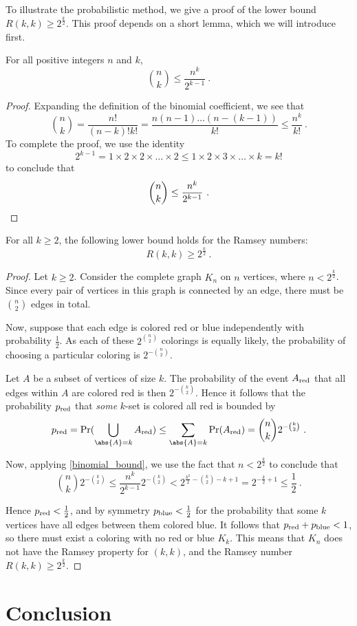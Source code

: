 \documentclass{article}
\begin{document}
To illustrate the probabilistic method, we give a proof of the lower bound $R(k,k) \geq 2^{\frac k 2}$. This proof depends on a short lemma, which we will introduce first.

\begin{Lemma} \label{binomial_bound}
    For all positive integers $n$ and $k$,
    \[ {n \choose k} \leq \frac{n^k}{2^{k-1}} \ . \]
\end{Lemma}

\begin{proof}
    Expanding the definition of the binomial coefficient, we see that
    \[
        {n \choose k}
        = \frac{n!}{(n-k)!k!}
        = \frac{n(n-1)\ldots(n-(k-1))}{k!}
        \leq \frac{n^k}{k!} \ .
    \]
    To complete the proof, we use the identity
    \[
        2^{k-1}
        = 1 \times 2 \times 2 \times \ldots \times 2
        \leq 1 \times 2 \times 3 \times \ldots \times k
        = k!
    \]
    to conclude that
    \[
        {n \choose k} \leq \frac{n^k}{2^{k-1}} \ . \qedhere
    \]
\end{proof}

\begin{Theorem}
    For all $k \geq 2$, the following lower bound holds for the Ramsey numbers:
    \[ R(k,k) \geq 2^{\frac k 2} \ . \]
\end{Theorem}

\begin{proof}
    Let $k \geq 2$. Consider the complete graph $K_n$ on $n$ vertices, where $n < 2^{\frac k 2}$. Since every pair of vertices in this graph is connected by an edge, there must be $n \choose 2$ edges in total.

    Now, suppose that each edge is colored red or blue independently with probability $\frac 1 2$. As each of these $2^{n \choose 2}$ colorings is equally likely, the probability of choosing a particular coloring is $2^{-{n \choose 2}}$.

    Let $A$ be a subset of vertices of size $k$. The probability of the event $A_{\mathrm{red}}$ that all edges within $A$ are colored red is then $2^{-{k \choose 2}}$. Hence it follows that the probability $p_{\mathrm{red}}$ that \emph{some} $k$-set is colored all red is bounded by
    \[
        p_\red = \Pr(\bigcup_{\abs{A} = k} A_\red)
        \leq \sum_{\abs{A} = k} \Pr(A_\red)
        = {n \choose k} 2^{-{k \choose 2}} \ .
    \]

Now, applying \cref{binomial_bound}, we use the fact that $n < 2^{\frac k 2}$ to conclude that
    \[
        {n \choose k} 2^{-{k \choose 2}}
        \leq \frac{n^k}{2^{k-1}} 2^{-{k \choose 2}}
        < 2^{\frac{k^2}{2} - {k \choose 2} - k + 1}
        = 2^{-\frac k 2 + 1}
        \leq \frac 1 2 \ .
    \]

Hence $p_{\mathrm{red}} < \frac 1 2$, and by symmetry $p_{\mathrm{blue}} < \frac 1 2$ for the probability that some $k$ vertices have all edges between them colored blue. It follows that $p_{\mathrm{red}} + p_{\mathrm{blue}} < 1$, so there must exist a coloring with no red or blue $K_k$. This means that $K_n$ does not have the Ramsey property for $(k, k)$, and the Ramsey number $R(k,k) \geq 2^{\frac k 2}$.
\end{proof}

\section{Conclusion}


\listoftodos



\end{document}
